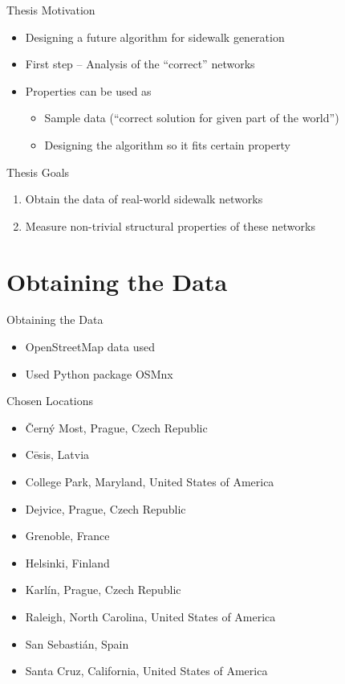 \documentclass{beamer}
\begin{document}
\begin{frame}{Thesis Motivation}

\begin{itemize}
    \item Designing a future algorithm for sidewalk generation
    \item First step – Analysis of the “correct” networks
    \item Properties can be used as
    \begin{itemize} 
        \item Sample data (“correct solution for given part of the world”)
        \item Designing the algorithm so it fits certain property
    \end{itemize}
\end{itemize}


\end{frame}
\begin{frame}{Thesis Goals}

\begin{enumerate}
    \item Obtain the data of real-world sidewalk networks
    \item Measure non-trivial structural properties of these networks 
\end{enumerate}

\end{frame}

\section{Obtaining the Data}
\begin{frame}[fragile]{Obtaining the Data}
    \begin{itemize}
        \item OpenStreetMap data used
        \item Used Python package OSMnx
    \end{itemize}
\end{frame}

\begin{frame}[fragile]{Chosen Locations}
    \begin{itemize}
        \item Černý Most, Prague, Czech Republic
        \item Cēsis, Latvia
        \item College Park, Maryland, United States of America
        \item Dejvice, Prague, Czech Republic
        \item Grenoble, France
        \item Helsinki, Finland
        \item Karlín, Prague, Czech Republic
        \item Raleigh, North Carolina, United States of America
        \item San Sebastián, Spain
        \item Santa Cruz, California, United States of America
    \end{itemize}
\end{frame}
\end{document}

